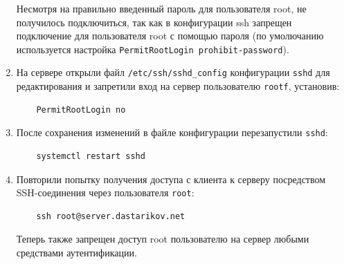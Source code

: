 \begin{enumerate}
Несмотря на правильно введенный пароль для пользователя root, не получилось подключиться, так как в конфигурации ssh запрещен подключение для пользователя root с помощью пароля (по умолючанию используется настройка \texttt{PermitRootLogin prohibit-password}).

\item На сервере открыли файл \texttt{/etc/ssh/sshd\_config} конфигурации \texttt{sshd} для редактирования и запретили вход на сервер пользователю \texttt{rootf}, установив:
  \begin{verbatim}
    PermitRootLogin no
  \end{verbatim}
\item После сохранения изменений в файле конфигурации перезапустили \texttt{sshd}:
  \begin{verbatim}
    systemctl restart sshd
  \end{verbatim}
\item Повторили попытку получения доступа с клиента к серверу посредством SSH-соединения через пользователя \texttt{root}:
  \begin{verbatim}
    ssh root@server.dastarikov.net
  \end{verbatim}

Теперь также запрещен доступ root пользователю на сервер любыми средствами аутентификации.

\end{enumerate}
